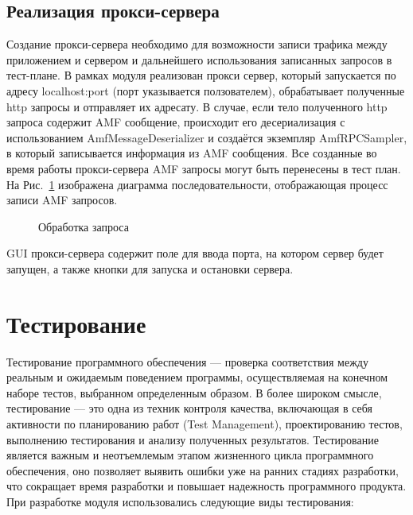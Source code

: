 \subsection{Реализация прокси-сервера}

Создание прокси-сервера необходимо для возможности записи трафика между приложением и сервером и дальнейшего использования 
записанных запросов в тест-плане. В рамках модуля реализован прокси сервер, который запускается по адресу 
localhost:port (порт указывается ползователем), обрабатывает полученные http запросы и отправляет их адресату. 
В случае, если тело полученного http запроса содержит AMF сообщение, происходит его десериализация с использованием 
AmfMessageDeserializer и создаётся экземпляр 
AmfRPCSampler, в который записывается информация из AMF сообщения. Все созданные во время работы прокси-сервера AMF запросы 
могут быть перенесены в тест план. На Рис.~\ref{ris:Diagram1.png} изображена диаграмма последовательности, отображающая
процесс записи AMF запросов.

\begin{figure}[ht]
\caption{Обработка запроса}
\label{ris:Diagram1.png}
\end{figure}

GUI прокси-сервера содержит поле для ввода порта, на котором сервер будет запущен, а также кнопки для запуска и остановки 
сервера.

\section{Тестирование}

Тестирование программного обеспечения --- проверка соответствия между реальным и ожидаемым поведением программы,
осуществляемая на конечном наборе тестов, выбранном определенным образом\cite{swebok}.
В более широком смысле, тестирование --- это одна из техник контроля качества, включающая в себя активности по
планированию работ (Test Management), проектированию тестов, выполнению тестирования и анализу полученных результатов.
Тестирование является важным и неотъемлемым этапом жизненного цикла программного обеспечения, оно позволяет выявить
ошибки уже на ранних стадиях разработки, что сокращает время разработки и повышает надежность программного продукта.
При разработке модуля использовались следующие виды тестирования:

